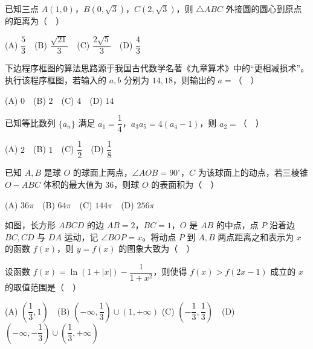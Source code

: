\begin{question}
已知三点 $A(1,0)$，$B(0,\sqrt3)$，$C(2,\sqrt3)$，则 $\triangle ABC$ 外接圆的圆心到原点的距离为（　）

(A) $\dfrac53$　(B) $\dfrac{\sqrt{21}}3$　(C) $\dfrac{2\sqrt5}3$　(D) $\dfrac43$

\Needspace{0.4\textheight}
\end{question}
\begin{question}
下边程序框图的算法思路源于我国古代数学名著《九章算术》中的“更相减损术”。执行该程序框图，若输入的 $a,b$ 分别为 $14,18$，则输出的 $a=$（　）
\nopagebreak[4]
\begin{center}\end{center}
\nopagebreak[4]
(A) $0$　(B) $2$　(C) $4$　(D) $14$

\end{question}
\begin{question}
已知等比数列 $\{a_n\}$ 满足 $a_1=\dfrac14$，$a_3a_5=4(a_4-1)$，则 $a_2=$（　）

(A) $2$　(B) $1$　(C) $\dfrac12$　(D) $\dfrac18$

\end{question}
\begin{question}
已知 $A,B$ 是球 $O$ 的球面上两点，$\angle AOB=90^\circ$，$C$ 为该球面上的动点，若三棱锥 $O-ABC$ 体积的最大值为 $36$，则球 $O$ 的表面积为（　）

(A) $36\pi$　(B) $64\pi$　(C) $144\pi$　(D) $256\pi$

\Needspace{0.4\textheight}
\end{question}
\begin{question}
如图，长方形 $ABCD$ 的边 $AB=2$，$BC=1$，$O$ 是 $AB$ 的中点，点 $P$ 沿着边 $BC,CD$ 与 $DA$ 运动，记 $\angle BOP=x$。将动点 $P$ 到 $A,B$ 两点距离之和表示为 $x$ 的函数 $f(x)$，则 $y=f(x)$ 的图象大致为（　）
\nopagebreak[4]
\begin{center}\end{center}
\nopagebreak[4]
\nopagebreak[4]
\begin{center}\end{center}
\nopagebreak[4]
\nopagebreak[4]
\begin{center}\end{center}
\nopagebreak[4]
\nopagebreak[4]
\begin{center}\end{center}
\nopagebreak[4]
\nopagebreak[4]
\begin{center}\end{center}
\nopagebreak[4]
\end{question}
\begin{question}
设函数 $f(x)=\ln(1+|x|)-\dfrac1{1+x^2}$，则使得 $f(x)>f(2x-1)$ 成立的 $x$ 的取值范围是（　）

(A) $\left(\dfrac13,1\right)$　(B) $\left(-\infty,\dfrac13\right)\cup(1,+\infty)$  
(C) $\left(-\dfrac13,\dfrac13\right)$　(D) $\left(-\infty,-\dfrac13\right)\cup\left(\dfrac13,+\infty\right)$

\end{question}

